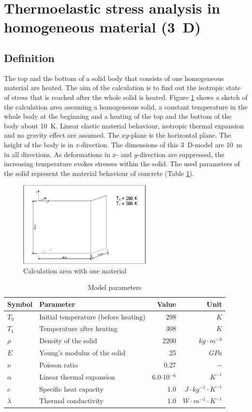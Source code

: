 \section{Thermoelastic stress analysis in homogeneous material (3~D)}
\subsection{Definition}
The top and the bottom of a solid body that consists of one homogeneous  material are heated. The aim of the calculation is to find out the isotropic state of stress that is reached after the whole solid is heated. 
%
Figure \ref{fig61} shows a sketch of the calculation area assuming a homogeneous solid, a constant temperature in the whole body at the beginning and a heating of the top and the bottom of the body about 10~K.
Linear elastic material behaviour, isotropic thermal expansion and no gravity effect are assumed.
%
The $xy$-plane is the horizontal plane. The height of the body is in $z$-direction. The dimensions of this 3~D-model are 10~m in all directions. 
As deformations in $x$- and $y$-direction are suppressed, the increasing temperature evokes stresses within the solid. 
The used parameters of the solid represent the material behaviour of concrete (Table \ref{tab61}).

\begin{figure}[htbp]
\centering
\includegraphics[width=0.6\textwidth]{PART_III/TM/figures/fig61}
\caption{Calculation area with one material}
\label{fig61}
\end{figure}

\begin{table}[htbp]
\centering
\caption{Model parameters}
\label{tab61}
\begin{tabular}{llrr}
\toprule
Symbol & Parameter & Value & Unit \\
\midrule
$T_0$  & Initial temperature (before heating) & 298 & $K$ \\
$T_1$  & Temperature after heating & 308 & $K$ \\
$\rho$  & Density of the solid &  2200 & $kg \cdot m^{-3}$  \\			
$E$ & Young's modulus of the solid & 25 & $GPa$ \\
$\nu$ & Poisson ratio & 0.27 & $-$ \\
$\alpha$ & Linear thermal expansion & 6.0$\cdot$10$^{-6}$ & $K^{-1}$ \\
$c$      & Specific heat capacity & 1.0 & $J\cdot kg^{-1}\cdot K^{-1}$ \\
$\lambda$ & Thermal conductivity & 1.0 & $W\cdot m^{-1}\cdot K^{-1}$ \\
\bottomrule
\end{tabular}
\end{table}



